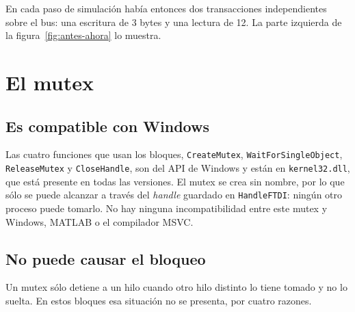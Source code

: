 \documentclass[11pt]{article}
\newcommand{\code}[1]{\texttt{#1}}
\begin{document}
En cada paso de simulación había entonces dos transacciones independientes
sobre el bus: una escritura de 3 bytes y una lectura de 12. La parte izquierda
de la figura~\ref{fig:antes-ahora} lo muestra.

\section{El mutex}
\label{sec:mutex}

\subsection{Es compatible con Windows}

Las cuatro funciones que usan los bloques, \code{CreateMutex},
\code{WaitForSingleObject}, \code{ReleaseMutex} y \code{CloseHandle}, son del
API de Windows y están en \code{kernel32.dll}, que está presente en todas las
versiones. El mutex se crea sin nombre, por lo que sólo se puede alcanzar a
través del \emph{handle} guardado en \code{HandleFTDI}: ningún otro proceso
puede tomarlo. No hay ninguna incompatibilidad entre este mutex y Windows,
MATLAB o el compilador MSVC.

\subsection{No puede causar el bloqueo}

Un mutex sólo detiene a un hilo cuando otro hilo distinto lo tiene tomado y no
lo suelta. En estos bloques esa situación no se presenta, por cuatro razones.
\end{document}
